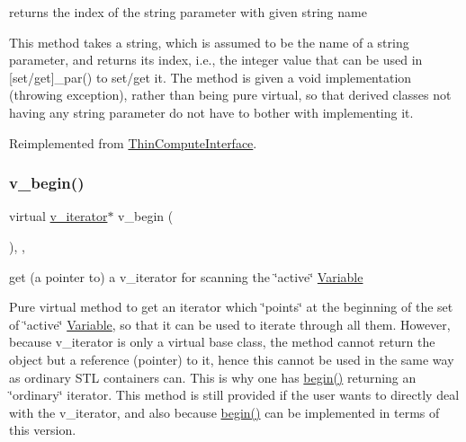 returns the index of the string parameter with given string name 

This method takes a string, which is assumed to be the name of a string parameter, and returns its index, i.\+e., the integer value that can be used in \mbox{[}set/get\mbox{]}\+\_\+par() to set/get it. The method is given a void implementation (throwing exception), rather than being pure virtual, so that derived classes not having any string parameter do not have to bother with implementing it. 

Reimplemented from \mbox{\hyperlink{class_s_m_spp__di__unipi__it_1_1_thin_compute_interface_ac89d3c2e4aeb331035bc878f0f9deeae}{Thin\+Compute\+Interface}}.

\mbox{\label{class_s_m_spp__di__unipi__it_1_1_f_row_constraint_ad0b5bcf42a678385fdba6fe41ce9626b}} 
\subsubsection{\texorpdfstring{v\+\_\+begin()}{v\_begin()}\hspace{0.1cm}{\footnotesize\ttfamily [1/2]}}
{\footnotesize\ttfamily virtual \mbox{\hyperlink{class_s_m_spp__di__unipi__it_1_1_thin_var_dep_interface_1_1v__iterator}{v\+\_\+iterator}}$\ast$ v\+\_\+begin (\begin{DoxyParamCaption}\item[{void}]{ }\end{DoxyParamCaption})\hspace{0.3cm}{\ttfamily [inline]}, {\ttfamily [override]}, {\ttfamily [virtual]}}



get (a pointer to) a v\+\_\+iterator for scanning the \char`\"{}active\char`\"{} \mbox{\hyperlink{class_s_m_spp__di__unipi__it_1_1_variable}{Variable}} 

Pure virtual method to get an iterator which \char`\"{}points\char`\"{} at the beginning of the set of \char`\"{}active\char`\"{} \mbox{\hyperlink{class_s_m_spp__di__unipi__it_1_1_variable}{Variable}}, so that it can be used to iterate through all them. However, because v\+\_\+iterator is only a virtual base class, the method cannot return the object but a reference (pointer) to it, hence this cannot be used in the same way as ordinary S\+TL containers can. This is why one has \mbox{\hyperlink{group___thin_var_dep_interface___c_l_a_s_s_e_s_ga79162df6cbf36b4997db545dc30969e2}{begin()}} returning an \char`\"{}ordinary\char`\"{} iterator. This method is still provided if the user wants to directly deal with the v\+\_\+iterator, and also because \mbox{\hyperlink{group___thin_var_dep_interface___c_l_a_s_s_e_s_ga79162df6cbf36b4997db545dc30969e2}{begin()}} can be implemented in terms of this version. 

